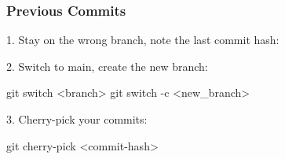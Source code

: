 
\subsubsection{Previous Commits}
1. Stay on the wrong branch, note the last commit hash: 

2. Switch to main, create the new branch:
\begin{gitBashBox}
    git switch <branch>
    git switch -c <new_branch>
\end{gitBashBox}

3. Cherry-pick your commits:
\begin{gitBashBox}
    git cherry-pick <commit-hash>
\end{gitBashBox}

